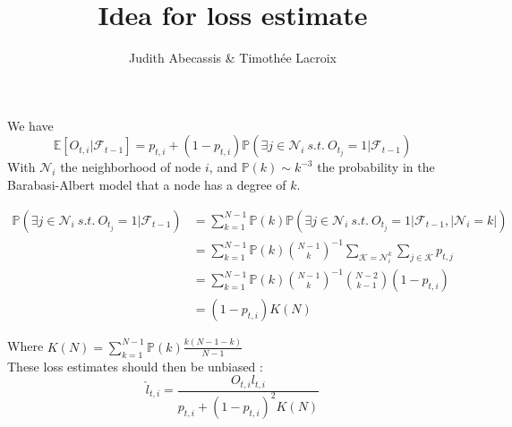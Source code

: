 \documentclass[10pt,a4paper]{scrartcl}
\author{Judith Abecassis \& Timothée Lacroix}
\title{Idea for loss estimate}
\providecommand{\E}{\mathbb{E}}
\providecommand{\Prob}{\mathbb{P}}
\begin{document}
We have
$$\E[O_{t,i} | \mathcal{F}_{t-1}] = p_{t,i} + (1-p_{t,i})\Prob(\exists j \in \mathcal{N}_i~s.t.~O_{t_j}=1 | \mathcal{F}_{t-1})$$
With $\mathcal{N}_i$ the neighborhood of node $i$, and $\Prob(k)\sim k^{-3}$ the probability in the Barabasi-Albert model that a node has a degree of $k$.

\begin{align*}
  \Prob(\exists j \in \mathcal{N}_i~s.t.~O_{t_j}=1 | \mathcal{F}_{t-1}) &= \sum_{k=1}^{N-1} \Prob(k)\Prob(\exists j \in \mathcal{N}_i~s.t.~O_{t_j}=1 | \mathcal{F}_{t-1}, |\mathcal{N}_i=k|)\\
    &= \sum_{k=1}^{N-1} \Prob(k) \binom{N-1}{k}^{-1} \sum_{\mathcal{K} = \mathcal{N}^k_i}\sum_{j \in \mathcal{K}} p_{t,j}  \\
    &= \sum_{k=1}^{N-1} \Prob(k) \binom{N-1}{k}^{-1} \binom{N-2}{k-1}(1-p_{t,i})  \\
    &= (1-p_{t,i})K(N)
\end{align*}

Where $K(N) = \sum_{k=1}^{N-1}\Prob(k)\frac{k(N-1-k)}{N-1}$\\

These loss estimates should then be unbiased : 
$$\hat{l}_{t,i} = \frac{O_{t,i}l_{t,i}}{p_{t,i}+(1-p_{t,i})^2K(N)}$$
\end{document}
